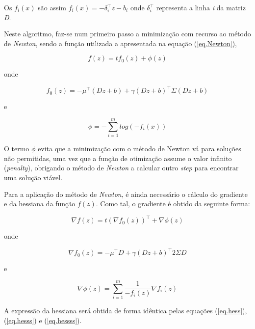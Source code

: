 \documentclass[a4paper]{IEEEtran}
\begin{document}
Os $f_i(x)$ são assim $f_i(x) = -\delta_i^\top z - b_i$ onde $\delta_i^\top$ representa a linha \textit{i} da matriz \textit{D}.




Neste algoritmo, faz-se num primeiro passo a minimização com recurso ao método de \textit{Newton}, sendo a função utilizada a apresentada na equação (\ref{eq.Newton}),

\begin{equation}
\label{eq.Newton}
f(z) = t f_0 (z) + \phi (z)
\end{equation}

onde

\begin{equation}
f_0 (z) = -\mu^\top (D z + b) + \gamma (D z + b)^\top \Sigma (D z + b)
\end{equation}

e

\begin{equation}
\phi = -\sum_{i=1}^{m} log(-f_i(x))
\end{equation}

O termo $\phi$ evita que a minimização com o método de Newton vá para soluções não permitidas, uma vez que a função de otimização assume o valor infinito (\textit{penalty}), obrigando o método de \textit{Newton} a calcular outro \textit{step} para encontrar uma solução viável.

Para a aplicação do método de \textit{Newton}, é ainda necessário o cálculo do gradiente e da hessiana da função $f (z)$. Como tal, o gradiente é obtido da seguinte forma:

\begin{equation}
\nabla f(z) = t (\nabla f_0(z))^\top + \nabla \phi (z)
\end{equation}

onde

\begin{equation}
\nabla f_0 (z) = -\mu^\top D + \gamma (D z + b)^\top 2 \Sigma D  
\end{equation}

e

\begin{equation}
\nabla \phi (z) = \sum_{i=1}^{m} \frac{1}{-f_i (z)} \nabla f_i (z) 
\end{equation}

A expressão da hessiana será obtida de forma idêntica pelas equações (\ref{eq.hess}), (\ref{eq.hesss}) e (\ref{eq.hessss}).
\end{document}
